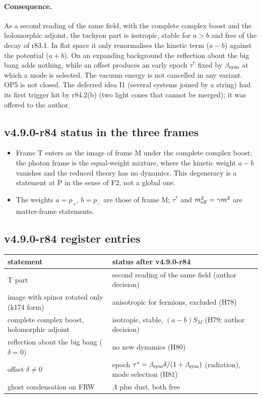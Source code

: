\paragraph{Consequence.}
As a second reading of the same field, with the complete complex boost and the holomorphic adjoint, the tachyon part is isotropic, stable
for \(a>b\) and free of the decay of r83.1.  In flat space it only renormalises the kinetic term (\(a-b\)) against the potential (\(a+b\)).  On
an expanding background the reflection about the big bang adds nothing, while an offset produces an early epoch \(\tau^*\) fixed by \(\beta_{\mathrm{sym}}\)
at which a mode is selected.  The vacuum energy is not cancelled in any variant.  OP5 is not closed.  The deferred idea I1 (several
systems joined by a string) had its first trigger hit by r84.2(b) (two light cones that cannot be merged); it was offered to the author.

\subsection*{v4.9.0-r84 status in the three frames}
\label{subsec:v490-r84-frames}

\begin{itemize}[leftmargin=2em]
\item Frame T enters as the image of frame M under the complete complex boost; the photon frame is the equal-weight mixture, where the
kinetic weight \(a-b\) vanishes and the reduced theory has no dynamics.  This degeneracy is a statement at P in the sense of F2, not a
global one.
\item The weights \(a=p_+\), \(b=p_-\) are those of frame M; \(\tau^*\) and \(m_{\rm eff}^2=\gamma m^2\) are matter-frame statements.
\end{itemize}

\subsection*{v4.9.0-r84 register entries}
\label{subsec:v490-r84-register}

\begin{center}
\small
\begin{tabular}{@{}>{\raggedright\arraybackslash}p{}>{\raggedright\arraybackslash}p{}@{}}
\toprule
statement & status after v4.9.0-r84\\
\midrule
T part & second reading of the same field (author decision)\\
image with spinor rotated only (k174 form) & anisotropic for fermions, excluded (H78)\\
complete complex boost, holomorphic adjoint & isotropic, stable, \((a-b)S_M\) (H79; author decision)\\
reflection about the big bang (\(\delta=0\)) & no new dynamics (H80)\\
offset \(\delta\neq0\) & epoch \(\tau^*=\beta_{\mathrm{sym}}\delta/(1+\beta_{\mathrm{sym}})\) (radiation), mode selection (H81)\\
ghost condensation on FRW & \(\Lambda\) plus dust, both free\\
\bottomrule
\end{tabular}
\end{center}

